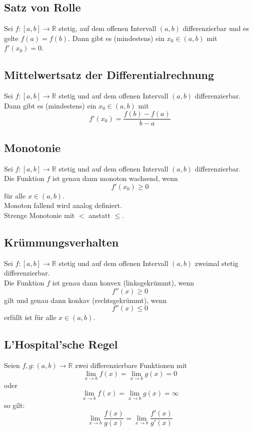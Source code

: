 \documentclass[a4paper,twocolumn,10pt]{article}
\begin{document}
\subsection{Satz von Rolle}
Sei $f:[a,b]\rightarrow\mathbb{R}$ stetig, auf dem offenen Intervall $(a,b)$ differenzierbar und es gelte $f(a)=f(b)$. Dann gibt es (mindestens) ein $x_0\in (a,b)$ mit $f'(x_0)=0$.

\subsection{Mittelwertsatz der Differentialrechnung}
Sei $f:[a,b]\rightarrow\mathbb{R}$ stetig und auf dem offenen Intervall $(a,b)$ differenzierbar. Dann gibt es (mindestens) ein $x_0\in(a,b)$ mit
\begin{equation*}
f'(x_0)=\frac{f(b)-f(a)}{b-a}
\end{equation*}

\subsection{Monotonie}
Sei $f:[a,b]\rightarrow \mathbb{R}$ stetig und auf dem offenen Intervall $(a,b)$ differenzierbar.\\
Die Funktion $f$ ist genau dann monoton wachsend, wenn
\begin{equation*}
f'(x_0)\geq 0
\end{equation*}
für alle $x\in(a,b)$.\\
Monoton fallend wird analog definiert.\\
Strenge Monotonie mit $<$ anstatt $\leq$.

\subsection{Krümmungsverhalten}
Sei $f:[a,b]\rightarrow\mathbb{R}$ stetig und auf dem offenen Intervall $(a,b)$ zweimal stetig differenzierbar.\\
Die Funktion $f$ ist genau dann konvex (linksgekrümmt), wenn
\begin{equation*}
f''(x)\geq 0
\end{equation*}
gilt und genau dann konkav (rechtsgekrümmt), wenn
\begin{equation*}
f''(x)\leq 0
\end{equation*}
erfüllt ist für alle $x\in (a,b)$.

\subsection{L'Hospital'sche Regel}
Seien $f,g:(a,b)\rightarrow\mathbb{R}$ zwei differenzierbare Funktionen mit
\begin{equation*}
\lim\limits_{x\rightarrow b}f(x)=\lim\limits_{x\rightarrow b}g(x)=0
\end{equation*}
oder
\begin{equation*}
\lim\limits_{x\rightarrow b}f(x)=\lim\limits_{x\rightarrow b}g(x)=\infty
\end{equation*}
so gilt:
\begin{equation*}
\lim\limits_{x\rightarrow b}\frac{f(x)}{g(x)}=\lim\limits_{x\rightarrow b}\frac{f'(x)}{g'(x)}
\end{equation*}
\end{document}

